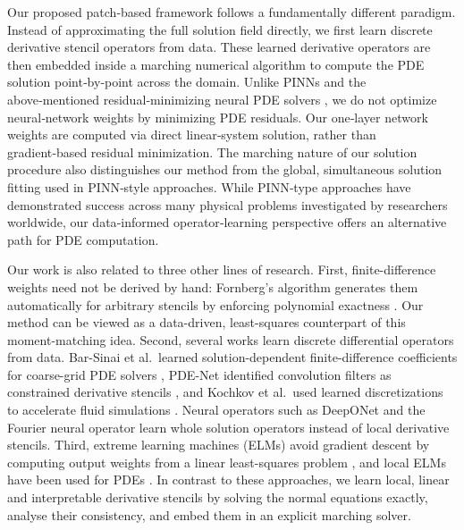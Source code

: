 \documentclass[pdflatex,sn-mathphys-num]{sn-jnl}%
\theoremstyle{thmstyleone}%
\theoremstyle{thmstyletwo}%
\theoremstyle{thmstylethree}%
\begin{document}
Our proposed patch‑based framework follows a fundamentally different paradigm. Instead of approximating the full solution field directly, we first learn discrete derivative stencil operators from data. These learned derivative operators are then embedded inside a marching numerical algorithm to compute the PDE solution point‑by‑point across the domain. Unlike PINNs and the above‑mentioned residual‑minimizing neural PDE solvers \cite{lagaris1998artificial,aarts2001neural,kumar2011multilayer,raissi2019physics,cuomo2022review,shiri2022adaptive}, we do not optimize neural‑network weights by minimizing PDE residuals. Our one‑layer network weights are computed via direct linear‑system solution, rather than gradient‑based residual minimization. The marching nature of our solution procedure also distinguishes our method from the global, simultaneous solution fitting used in PINN‑style approaches. While PINN‑type approaches have demonstrated success across many physical problems investigated by researchers worldwide, our data‑informed operator‑learning perspective offers an alternative path for PDE computation.

Our work is also related to three other lines of research. First, finite-difference weights need not be derived by hand: Fornberg's algorithm generates them automatically for arbitrary stencils by enforcing polynomial exactness \cite{fornberg1988generation}. Our method can be viewed as a data-driven, least-squares counterpart of this moment-matching idea. Second, several works learn discrete differential operators from data. Bar-Sinai et al.\ learned solution-dependent finite-difference coefficients for coarse-grid PDE solvers \cite{barsinai2019learning}, PDE-Net identified convolution filters as constrained derivative stencils \cite{long2018pdenet}, and Kochkov et al.\ used learned discretizations to accelerate fluid simulations \cite{kochkov2021machine}. Neural operators such as DeepONet \cite{lu2021deeponet} and the Fourier neural operator \cite{li2021fourier} learn whole solution operators instead of local derivative stencils. Third, extreme learning machines (ELMs) avoid gradient descent by computing output weights from a linear least-squares problem \cite{huang2006extreme}, and local ELMs have been used for PDEs \cite{dong2021local}. In contrast to these approaches, we learn local, linear and interpretable derivative stencils by solving the normal equations exactly, analyse their consistency, and embed them in an explicit marching solver.
\end{document}
